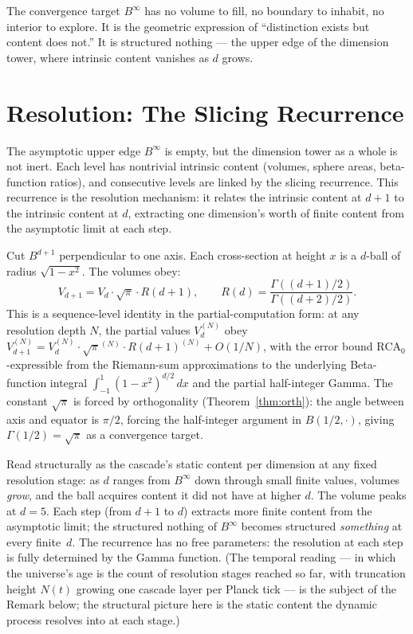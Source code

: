 \documentclass[11pt,a4paper]{article}
\begin{document}
The convergence target $B^\infty$ has no volume to fill, no
boundary to inhabit, no interior to explore. It is the geometric
expression of ``distinction exists but content does not.'' It is
structured nothing --- the upper edge of the dimension tower, where
intrinsic content vanishes as $d$ grows.

\section{Resolution: The Slicing Recurrence}\label{sec:nothing-unstable}

The asymptotic upper edge $B^\infty$ is empty, but the dimension tower
as a whole is not inert. Each level has nontrivial intrinsic content
(volumes, sphere areas, beta-function ratios), and consecutive levels
are linked by the slicing recurrence. This recurrence is the
resolution mechanism: it relates the intrinsic content at $d+1$ to
the intrinsic content at $d$, extracting one dimension's worth of
finite content from the asymptotic limit at each step.

Cut $B^{d+1}$ perpendicular to one axis. Each cross-section at height
$x$ is a $d$-ball of radius $\sqrt{1-x^2}$. The volumes obey:
\[
V_{d+1} = V_d \cdot \sqrt{\pi}\cdot R(d+1), \qquad R(d) =
\frac{\Gamma((d+1)/2)}{\Gamma((d+2)/2)}.
\]
This is a sequence-level identity in the partial-computation form:
at any resolution depth $N$, the partial values $V_d^{(N)}$ obey
$V_{d+1}^{(N)} = V_d^{(N)}\cdot\sqrt{\pi}^{(N)}\cdot R(d+1)^{(N)} +
O(1/N)$, with the error bound $\mathrm{RCA}_0$-expressible from the
Riemann-sum approximations to the underlying Beta-function integral
$\int_{-1}^1 (1-x^2)^{d/2}\,dx$ and the partial half-integer Gamma.
The constant $\sqrt{\pi}$ is forced by orthogonality
(Theorem~\ref{thm:orth}): the angle between axis and equator is
$\pi/2$, forcing the half-integer argument in $B(1/2,\cdot)$, giving
$\Gamma(1/2) = \sqrt{\pi}$ as a convergence target.

Read structurally as the cascade's static content per dimension at any
fixed resolution stage: as $d$ ranges from $B^\infty$ down through
small finite values, volumes \emph{grow}, and the ball acquires content
it did not have at higher $d$. The volume peaks at $d = 5$. Each step
(from $d{+}1$ to $d$) extracts more finite content from the asymptotic
limit; the structured nothing of $B^\infty$ becomes structured
\emph{something} at every finite~$d$. The recurrence has no free
parameters: the resolution at each step is fully determined by the
Gamma function. (The temporal reading --- in which the universe's age
is the count of resolution stages reached so far, with truncation
height $N(t)$ growing one cascade layer per Planck tick --- is the
subject of the Remark below; the structural picture here is the static
content the dynamic process resolves into at each stage.)
\end{document}
